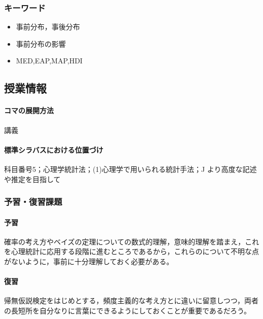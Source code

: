 \subsubsection{キーワード}
\begin{itemize}
	\item 事前分布，事後分布
	\item 事前分布の影響
	\item MED,EAP,MAP,HDI
\end{itemize}
\subsection{授業情報}
\paragraph{コマの展開方法}
講義
\paragraph{標準シラバスにおける位置づけ}
科目番号5；心理学統計法；(1)心理学で用いられる統計手法；J より高度な記述や推定を目指して
\subsubsection{予習・復習課題}
\paragraph{予習}確率の考え方やベイズの定理についての数式的理解，意味的理解を踏まえ，これを心理統計に応用する段階に進むところであるから，これらのについて不明な点がないように，事前に十分理解しておく必要がある。
\paragraph{復習}帰無仮説検定をはじめとする，頻度主義的な考え方とに違いに留意しつつ，両者の長短所を自分なりに言葉にできるようにしておくことが重要であるだろう。
